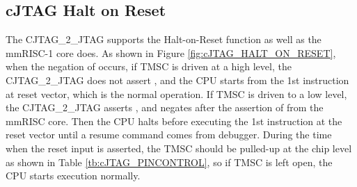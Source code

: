 \begin{table}[hbtp]
  \caption{cJTAG Pin Control}
  \label{tb:cJTAG_PINCONTROL}
\end{table}

\subsection{cJTAG Halt on Reset}

The CJTAG\_2\_JTAG supports the Halt-on-Reset function as well as the mmRISC-1 core does. As shown in Figure \ref{fig:cJTAG_HALT_ON_RESET}, when the negation of  occurs, if TMSC is driven at a high level, the CJTAG\_2\_JTAG does not assert , and the CPU starts from the 1st instruction at reset vector, which is the normal operation. If TMSC is driven to a low level, the CJTAG\_2\_JTAG asserts , and negates  after the assertion of  from the mmRISC core. Then the CPU halts before executing the 1st instruction at the reset vector until a resume command comes from debugger. During the time when the reset input is asserted, the TMSC should be pulled-up at the chip level as shown in Table \ref{tb:cJTAG_PINCONTROL}, so if TMSC is left open, the CPU starts execution normally.

